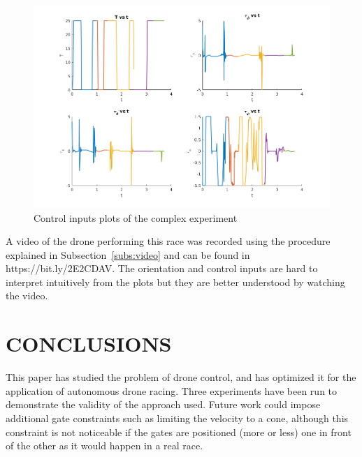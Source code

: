 \documentclass[letterpaper, 10 pt, conference]{ieeeconf}  %
\begin{document}
\begin{figure}[!htpb]
	\centering
	\includegraphics[width=1.0\linewidth]{Images/final_race/controls.png}
	\caption{Control inputs plots of the complex experiment}
	\label{fig:final_controls}
\end{figure}

A video of the drone performing this race was recorded using the procedure explained in Subsection~\ref{subs:video} and can be found in https://bit.ly/2E2CDAV. The orientation and control inputs are hard to interpret intuitively from the plots but they are better understood by watching the video.

\section{CONCLUSIONS}\label{s:conclusions}

This paper has studied the problem of drone control, and has optimized it for the application of autonomous drone racing. Three experiments have been run to demonstrate the validity of the approach used. Future work could impose additional gate constraints such as limiting the velocity to a cone, although this constraint is not noticeable if the gates are positioned (more or less) one in front of the other as it would happen in a real race.

\addtolength{\textheight}{-12cm}   %
\end{document}
